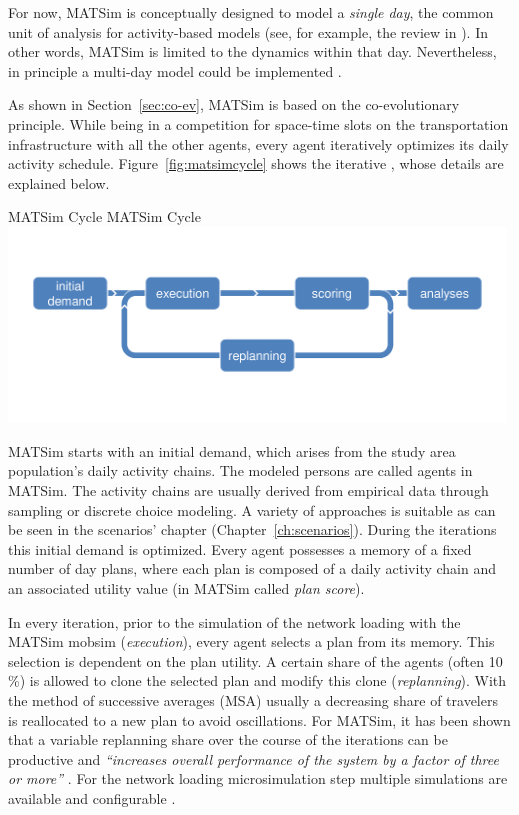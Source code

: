 For now, MATSim is conceptually designed to model a \emph{single day}, the common unit of analysis for activity-based models (see, for example, the review in \citet[][]{Bowman_TEC_2009_1}). In other words, MATSim is limited to the dynamics within that day. Nevertheless, in principle a multi-day model could be implemented \citep[][]{HorniEtAl_TechRep_IVT_2012_a}.

As shown in Section~\ref{sec:co-ev}, MATSim is based on the co-evolutionary principle. While being in a competition for space-time slots on the transportation infrastructure with all the other agents, every agent iteratively optimizes its daily \gls{activity} schedule. Figure~\ref{fig:matsimcycle} shows the iterative , whose details are explained below. 

\createfigure%
{MATSim Cycle}%
{MATSim Cycle}%
{\label{fig:matsimcycle}}%
{\includegraphics[width=0.99\textwidth, angle=0]{figures/matsimcycle.pdf}}%
{}

MATSim starts with an initial demand, which arises from the study area population's daily activity chains. The modeled persons are called agents in MATSim. The activity chains are usually derived from empirical data through sampling or discrete choice modeling. A variety of approaches is suitable as can be seen in the scenarios' chapter (Chapter~\ref{ch:scenarios}). During the iterations this initial demand is optimized. Every agent possesses a memory of a fixed number of day plans, where each \gls{plan} is composed of a daily activity chain and an associated utility value (in MATSim called \emph{plan \gls{score}}).

In every iteration, prior to the simulation of the network loading with the MATSim \gls{mobsim} \citep[e.g.,][]{Cetin_PhDThesis_2005} (\emph{execution}), every agent selects a plan from its memory. This selection is dependent on the plan \gls{utility}. A certain share of the agents 
(often 10\,\%) is allowed to clone the selected plan and modify this clone (\emph{\gls{replanning}}). With the method of successive averages (MSA) usually a decreasing share of travelers is reallocated to a new plan to avoid oscillations. For MATSim, it has been shown that a variable replanning share over the course of the iterations can be productive and \emph{``increases overall performance of the system by a factor of three or more''} \citep[][p.7f]{CharyparEtAl_IATBR_2006}. For the network loading microsimulation step multiple simulations are available and configurable \citep[][p.10f]{HorniEtAl_TechRep_IVT_2011_a}. 

